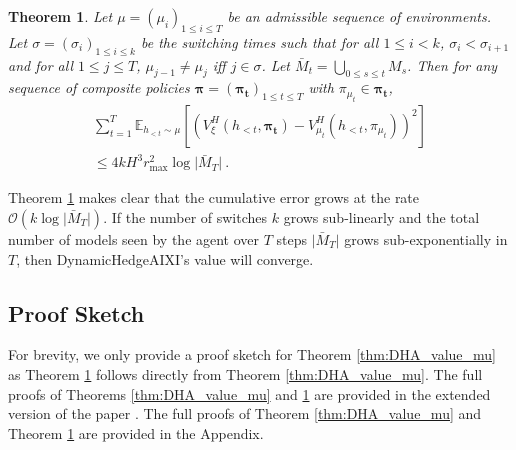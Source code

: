 \documentclass[letterpaper]{article} %
\newcommand {\bigO}{\mathcal{O}}
\newcommand {\E}{\mathbb{E}}
\newcommand{\abs}[1]{\lvert #1 \rvert}
\newtheorem{theorem}{Theorem}
\theoremstyle{definition}
\begin{document}
\begin{theorem}
\label{thm:DHA_value_constant}
    Let $\mu = (\mu_i)_{1 \leq i \leq T}$ be an admissible sequence of environments. 
    Let $\sigma = (\sigma_i)_{1 \leq i \leq k}$ be the switching times such that for all $1 \leq i < k$, $\sigma_i < \sigma_{i+1}$ and for all $1 \leq j \leq T$, $\mu_{j-1} \neq \mu_{j}$ iff $j \in \sigma$. 
    Let $\bar{M}_t = \bigcup_{0 \leq s \leq t} M_s$. 
    Then for any sequence of composite policies $\bm{\pi} = (\bm{\pi_t})_{1 \leq t \leq T}$ with $\pi_{\mu_t} \in \bm{\pi_t}$,
    \begin{multline}
        \sum_{t=1}^{T} \E_{h_{<t} \sim \mu} \left[ \left( V_{\xi}^{H}(h_{<t}, \bm{\pi_t}) - V_{\mu_{t}}^{H}(h_{<t}, \pi_{\mu_t}) \right)^2 \right] \\ \leq 4 k H^3 r_{\max}^2 \log \abs{\bar{M}_T}~.
    \end{multline}
\end{theorem}

Theorem \ref{thm:DHA_value_constant} makes clear that the cumulative error grows at the rate $\bigO \left( k \log \abs{\bar{M}_T} \right)$. If the number of switches $k$ grows sub-linearly and the total number of models seen by the agent over $T$ steps $\abs{\bar{M}_T}$ grows sub-exponentially in $T$, then DynamicHedgeAIXI's value will converge. 

\subsection{Proof Sketch}
For brevity, we only provide a proof sketch for Theorem \ref{thm:DHA_value_mu} as Theorem \ref{thm:DHA_value_constant} follows directly from Theorem \ref{thm:DHA_value_mu}.
\ifpaper
The full proofs of Theorems \ref{thm:DHA_value_mu} and \ref{thm:DHA_value_constant} are provided in the extended version of the paper \cite{yang2023dynamic}.
\fi
\ifarxiv
The full proofs of Theorem \ref{thm:DHA_value_mu} and Theorem \ref{thm:DHA_value_constant} are provided in the Appendix.
\fi
\end{document}
